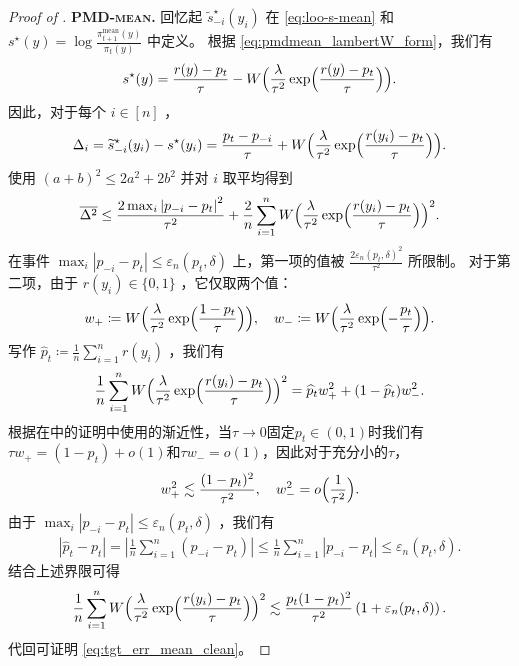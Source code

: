 \documentclass{article}
\theoremstyle{plain}
\theoremstyle{definition}
\theoremstyle{remark}
\newcommand{\cW}{W}
\newcommand{\abs}[1]{\left|#1\right|}
\begin{document}
\begin{proof}[Proof of ]
    \noindent\textbf{\textsc{PMD-mean}.}
    回忆起 $\widetilde{s}^\star_{-i}(y_i)$ 在 \eqref{eq:loo-s-mean} 和 $s^\star(y)=\log\frac{\pi^\mathrm{mean}_{t+1}(y)}{\pi_t(y)}$ 中定义。
    根据 \eqref{eq:pmdmean_lambertW_form}，我们有
    \begin{align*}
        s^\star(y)
        =\frac{r(y)-p_t}{\tau}-\cW\Bigl(\frac{\lambda}{\tau^2}\exp\Bigl(\frac{r(y)-p_t}{\tau}\Bigr)\Bigr).
    \end{align*}
    因此，对于每个 $i\in[n]$ ，
    \begin{align*}
        \Delta_i
        =\widetilde{s}^\star_{-i}(y_i)-s^\star(y_i)
        =\frac{p_t-p_{-i}}{\tau} + \cW\Bigl(\frac{\lambda}{\tau^2}\exp\Bigl(\frac{r(y_i)-p_t}{\tau}\Bigr)\Bigr).
    \end{align*}
    使用 $(a+b)^2\leq 2a^2+2b^2$ 并对 $i$ 取平均得到
    \begin{align*}
        \overline{\Delta^2}
        \leq \frac{2\max_i\abs{p_{-i}-p_t}^2}{\tau^2} + \frac{2}{n}\sum_{i=1}^n \cW\Bigl(\frac{\lambda}{\tau^2}\exp\Bigl(\frac{r(y_i)-p_t}{\tau}\Bigr)\Bigr)^2.
    \end{align*}
    在事件 $\max_i\abs{p_{-i}-p_t}\leq \varepsilon_n(p_t,\delta)$ 上，第一项的值被 $\frac{2\varepsilon_n(p_t,\delta)^2}{\tau^2}$ 所限制。  
对于第二项，由于 $r(y_i)\in\{0,1\}$ ，它仅取两个值：
    \begin{align*}
        w_+\coloneqq\cW\Bigl(\frac{\lambda}{\tau^2}\exp\Bigl(\frac{1-p_t}{\tau}\Bigr)\Bigr),
        \quad
        w_-\coloneqq\cW\Bigl(\frac{\lambda}{\tau^2}\exp\Bigl(-\frac{p_t}{\tau}\Bigr)\Bigr).
    \end{align*}
    写作 $\widehat{p}_t\coloneqq \frac{1}{n}\sum_{i=1}^n r(y_i)$ ，我们有
    \begin{align*}
        \frac{1}{n}\sum_{i=1}^n\cW\Bigl(\frac{\lambda}{\tau^2}\exp\Bigl(\frac{r(y_i)-p_t}{\tau}\Bigr)\Bigr)^2
        =\widehat{p}_t w_+^2 + (1-\widehat{p}_t) w_-^2.
    \end{align*}
    根据在中的证明中使用的渐近性，当$\tau\to 0$固定$p_t\in(0,1)$时我们有$\tau w_+=(1-p_t)+o(1)$和$\tau w_-=o(1)$，因此对于充分小的$\tau$，
    \begin{align*}
        w_+^2 \lesssim \frac{(1-p_t)^2}{\tau^2},
        \quad
        w_-^2 = o\Bigl(\frac{1}{\tau^2}\Bigr).
    \end{align*}
    由于 $\max_i\abs{p_{-i}-p_t}\leq\varepsilon_n(p_t,\delta)$ ，我们有 
    \begin{align*}
        \abs{\widehat{p}_t-p_t}
        =\abs{\frac{1}{n}\sum_{i=1}^n(p_{-i} - p_t)}
        \leq\frac{1}{n}\sum_{i=1}^n\abs{p_{-i} - p_t}
        \leq\varepsilon_n(p_t,\delta). 
    \end{align*}
    结合上述界限可得
    \begin{align*}
        \frac{1}{n}\sum_{i=1}^n\cW\Bigl(\frac{\lambda}{\tau^2}\exp\Bigl(\frac{r(y_i)-p_t}{\tau}\Bigr)\Bigr)^2
        \lesssim \frac{p_t(1-p_t)^2}{\tau^2}\left(1+\varepsilon_n(p_t,\delta)\right).
    \end{align*}
    代回可证明 \eqref{eq:tgt_err_mean_clean}。
\end{proof}
\end{document}
